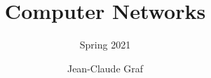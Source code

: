 \documentclass{scrartcl}
\begin{document}
    \rhead{\leftmark}

    \title{Computer Networks}
    \subtitle{Spring 2021}
    \author{Jean-Claude Graf}
    \maketitle

    \tableofcontents

    
    
    
    
    
    
    
    
    
    
\end{document}
